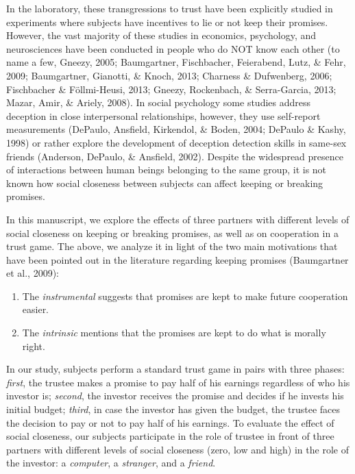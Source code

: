 \documentclass[12pt,]{article}
\begin{document}
In the laboratory, these transgressions to trust have been explicitly
studied in experiments where subjects have incentives to lie or not keep
their promises. However, the vast majority of these studies in
economics, psychology, and neurosciences have been conducted in people
who do NOT know each other (to name a few, Gneezy, 2005; Baumgartner,
Fischbacher, Feierabend, Lutz, \& Fehr, 2009; Baumgartner, Gianotti, \&
Knoch, 2013; Charness \& Dufwenberg, 2006; Fischbacher \& Föllmi-Heusi,
2013; Gneezy, Rockenbach, \& Serra-Garcia, 2013; Mazar, Amir, \& Ariely,
2008). In social psychology some studies address deception in close
interpersonal relationships, however, they use self-report measurements
(DePaulo, Ansfield, Kirkendol, \& Boden, 2004; DePaulo \& Kashy, 1998)
or rather explore the development of deception detection skills in
same-sex friends (Anderson, DePaulo, \& Ansfield, 2002). Despite the
widespread presence of interactions between human beings belonging to
the same group, it is not known how social closeness between subjects
can affect keeping or breaking promises.

In this manuscript, we explore the effects of three partners with
different levels of social closeness on keeping or breaking promises, as
well as on cooperation in a trust game. The above, we analyze it in
light of the two main motivations that have been pointed out in the
literature regarding keeping promises (Baumgartner et al., 2009):

\begin{enumerate}
\def\labelenumi{\arabic{enumi}.}
\item
  The \emph{instrumental} suggests that promises are kept to make future
  cooperation easier.
\item
  The \emph{intrinsic} mentions that the promises are kept to do what is
  morally right.
\end{enumerate}

In our study, subjects perform a standard trust game in pairs with three
phases: \emph{first}, the trustee makes a promise to pay half of his
earnings regardless of who his investor is; \emph{second}, the investor
receives the promise and decides if he invests his initial budget;
\emph{third}, in case the investor has given the budget, the trustee
faces the decision to pay or not to pay half of his earnings. To
evaluate the effect of social closeness, our subjects participate in the
role of trustee in front of three partners with different levels of
social closeness (zero, low and high) in the role of the investor: a
\emph{computer}, a \emph{stranger}, and a \emph{friend}.
\end{document}
